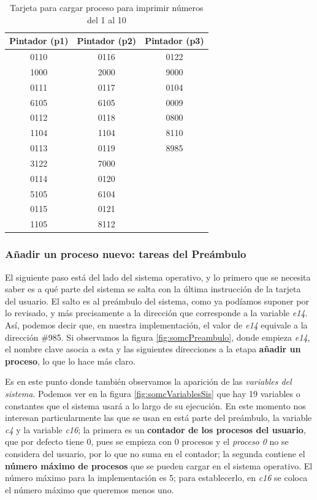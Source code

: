 \documentclass[letterpaper,12pt,oneside]{book}
\begin{document}
		
		
		
			\begin{table}[h]
			  \centering
			  \begin{tabular}{|c|c|c|}
			  \hline
				Pintador (p1) &Pintador (p2)&Pintador (p3)\\
			  \hline
			    0110	&	0116	&	0122	\\
				1000	&	2000	&	9000	\\
				0111	&	0117	&	0104	\\
				6105	&	6105	&	0009	\\
				0112	&	0118	&	0800	\\
				1104	&	1104	&	8110	\\
				0113	&	0119	&	8985	\\
				3122	&	7000	&		\\
				0114	&	0120	&		\\
				5105	&	6104	&		\\
				0115	&	0121	&		\\
				1105	&	8112	&		\\
				\hline
			  \end{tabular}
			  \caption{Tarjeta para cargar proceso para imprimir números del 1 al 10}
			  \label{tab:tarjetaContador1a10}
			\end{table}

            \subsubsection{Añadir un proceso nuevo: tareas del Preámbulo}
			
			El siguiente paso está del lado del sistema operativo, y lo primero que se necesita saber es a qué parte del sistema se salta con
			la última instrucción de la tarjeta del usuario. El
			salto es al preámbulo del sistema, como ya podíamos suponer por lo revisado, y más precisamente a la dirección que corresponde a la variable
			\textit{e14}. Así, podemos decir que, en nuestra implementación, el valor de \textit{e14} equivale a la dirección \#985. Si observamos la 
			figura
			\ref{fig:somcPreambulo}, donde empieza \textit{e14}, el nombre clave asocia a esta y las siguientes direcciones a la
			etapa \textbf{añadir un proceso}, lo que lo hace más claro. 
			
			Es en este punto donde también observamos la aparición de las \textit{variables del 
			sistema}. Podemos ver en la figura \ref{fig:somcVariablesSis} que hay 19 variables o constantes que el sistema usará a lo largo
			de su ejecución. En este momento nos interesan particularmente las que se usan en está parte del preámbulo,
			la variable \textit{c4} y la variable \textit{c16}; la primera es un \textbf{contador de los 
			procesos del usuario}, que por defecto tiene 0, pues se empieza con 0 procesos y el \textit{proceso 0} no se considera
			del usuario, por lo que no suma en el contador; la segunda contiene el \textbf{número máximo
			de procesos} que se pueden cargar en el sistema operativo. El número máximo para la implementación es 5; para establecerlo, en
            \textit{c16} se coloca el número máximo que queremos menos uno.
   
\end{document}
